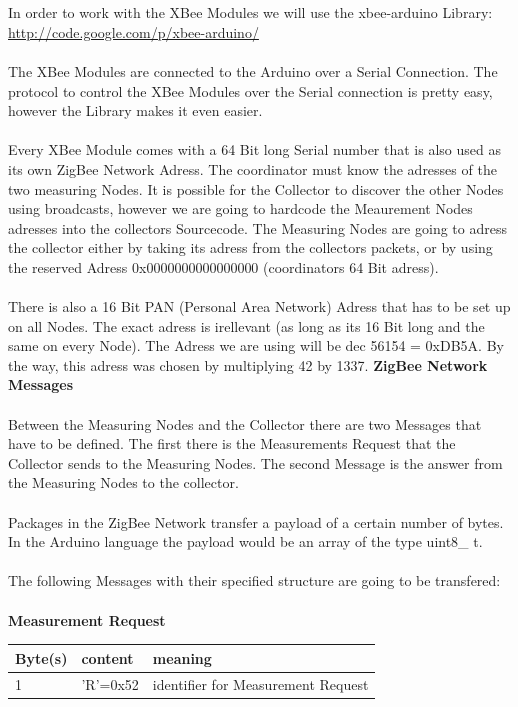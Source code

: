 \documentclass[
	11pt,
	a4paper
]{article}%
\begin{document}
\\\\
In order to work with the XBee Modules we will use the xbee-arduino Library:\\ \url{http://code.google.com/p/xbee-arduino/}
\\\\
The XBee Modules are connected to the Arduino over a Serial Connection. The protocol to control the XBee Modules over the Serial connection is pretty easy, however the Library makes it even easier.
\\\\
Every XBee Module comes with a 64 Bit long Serial number that is also used as its own ZigBee Network Adress. The coordinator must know the adresses of the two measuring Nodes. It is possible for the Collector to discover the other Nodes using broadcasts, however we are going to hardcode the Meaurement Nodes adresses into the collectors Sourcecode. The Measuring Nodes are going to adress the collector either by taking its adress from the collectors packets, or by using the reserved Adress 0x0000000000000000 (coordinators 64 Bit adress).
\\\\
There is also a 16 Bit PAN (Personal Area Network) Adress that has to be set up on all Nodes. The exact adress is irellevant (as long as its 16 Bit long and the same on every Node). The Adress we are using will be dec 56154 = 0xDB5A. By the way, this adress was chosen by multiplying 42 by 1337.
\newpage
\textbf{ZigBee Network Messages}
\\\\
Between the Measuring Nodes and the Collector there are two Messages that have to be defined. The first there is the Measurements Request that the Collector sends to the Measuring Nodes. The second Message is the answer from the Measuring Nodes to the collector.
\\\\
Packages in the ZigBee Network transfer a payload of a certain number of bytes. In the Arduino language the payload would be an array of the type uint8\_ t.
\\\\
The following Messages with their specified structure are going to be transfered:\\\\
\textbf{Measurement Request}
\begin{table}[h]
    \begin{tabular}{|l|l|l|}
    \hline
    \rowcolor{dunkelgrau}
    Byte(s) & content  & meaning                            \\ \hline
    1       & 'R'=0x52 & identifier for Measurement Request \\ \hline
    \end{tabular}
\end{table}\\
\end{document}
